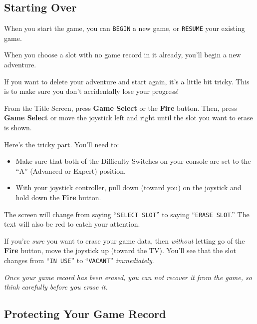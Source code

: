 \documentclass[10pt,twocolumn,openany,article]{memoir}
\begin{document}
\begin{description}
\fi

\section{Starting Over}\label{Starting Your Adventure Over}

\ifdefined\NOSAVE

When  you  start  the  game,  you can  \texttt{BEGIN}  a  new  game,  or
\texttt{RESUME} your existing game.

\else

When you choose a  slot with no game record in  it already, you'll begin
a new adventure.

If you want to delete your adventure  and start again, it's a little bit
tricky. This is to make sure you don't accidentally lose your progress!

From the  Title Screen, press  \textbf{Game Select} or the  \textbf{Fire} button.
Then, press  \textbf{Game Select}  or move the  joystick left  and right
until the slot you want to erase is shown.

Here's the tricky part. You'll need to:

\begin{itemize}
\item Make sure that both of the Difficulty Switches on your console
  are set to the ``A'' (Advanced or Expert) position.
\item With your joystick controller, pull down (toward you) on the
  joystick and hold down the \textbf{Fire} button.
\end{itemize}

The screen  will change from  saying ``\texttt{SELECT SLOT}''  to saying
``\texttt{ERASE  SLOT}.''   The  text   will  also   be  red   to  catch
your attention.

If  you're  \emph{sure}   you  want  to  erase  your   game  data,  then
\emph{without}  letting go  of the  \textbf{Fire}  button, move  the joystick  up
(toward  the TV).  You'll see  that the  slot changes  from ``\texttt{IN
  USE}'' to ``\texttt{VACANT}'' \emph{immediately}.

\emph{Once your game record has been erased, you can not recover it from
  the game, so think carefully before you erase it.}

\subsection{Protecting Your Game Record}


\end{description}
\end{document}
